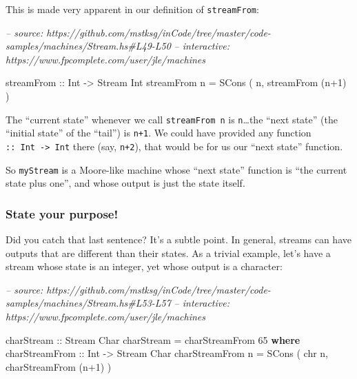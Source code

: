 \documentclass[]{article}
\newenvironment{Shaded}{}{}
\newcommand{\CommentTok}[1]{\textcolor[rgb]{0.38,0.63,0.69}{\textit{#1}}}
\newcommand{\DataTypeTok}[1]{\textcolor[rgb]{0.56,0.13,0.00}{#1}}
\newcommand{\DecValTok}[1]{\textcolor[rgb]{0.25,0.63,0.44}{#1}}
\newcommand{\FunctionTok}[1]{\textcolor[rgb]{0.02,0.16,0.49}{#1}}
\newcommand{\KeywordTok}[1]{\textcolor[rgb]{0.00,0.44,0.13}{\textbf{#1}}}
\newcommand{\NormalTok}[1]{#1}
\newcommand{\OtherTok}[1]{\textcolor[rgb]{0.00,0.44,0.13}{#1}}
\begin{document}
This is made very apparent in our definition of \texttt{streamFrom}:

\begin{Shaded}
\begin{Highlighting}[]
\CommentTok{-- source: https://github.com/mstksg/inCode/tree/master/code-samples/machines/Stream.hs#L49-L50}
\CommentTok{-- interactive: https://www.fpcomplete.com/user/jle/machines}

\OtherTok{    streamFrom ::} \DataTypeTok{Int} \OtherTok{->} \DataTypeTok{Stream} \DataTypeTok{Int}
\NormalTok{    streamFrom n }\FunctionTok{=} \DataTypeTok{SCons}\NormalTok{ ( n, streamFrom (n}\FunctionTok{+}\DecValTok{1}\NormalTok{) )}
\end{Highlighting}
\end{Shaded}

The ``current state'' whenever we call \texttt{streamFrom\ n} is
\texttt{n}\ldots{}the ``next state'' (the ``initial state'' of the ``tail'') is
\texttt{n+1}. We could have provided any function
\texttt{::\ Int\ -\textgreater{}\ Int} there (say, \texttt{n+2}), that would be
for us our ``next state'' function.

So \texttt{myStream} is a Moore-like machine whose ``next state'' function is
``the current state plus one'', and whose output is just the state itself.

\hypertarget{state-your-purpose}{%
\subsubsection{State your purpose!}\label{state-your-purpose}}

Did you catch that last sentence? It's a subtle point. In general, streams can
have outputs that are different than their states. As a trivial example, let's
have a stream whose state is an integer, yet whose output is a character:

\begin{Shaded}
\begin{Highlighting}[]
\CommentTok{-- source: https://github.com/mstksg/inCode/tree/master/code-samples/machines/Stream.hs#L53-L57}
\CommentTok{-- interactive: https://www.fpcomplete.com/user/jle/machines}

\OtherTok{charStream ::} \DataTypeTok{Stream} \DataTypeTok{Char}
\NormalTok{charStream }\FunctionTok{=}\NormalTok{ charStreamFrom }\DecValTok{65}
  \KeywordTok{where}
\OtherTok{    charStreamFrom ::} \DataTypeTok{Int} \OtherTok{->} \DataTypeTok{Stream} \DataTypeTok{Char}
\NormalTok{    charStreamFrom n }\FunctionTok{=} \DataTypeTok{SCons}\NormalTok{ ( chr n, charStreamFrom (n}\FunctionTok{+}\DecValTok{1}\NormalTok{) )}
\end{Highlighting}
\end{Shaded}
\end{document}
